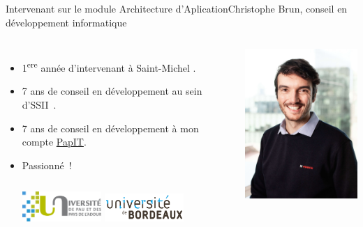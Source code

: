 \documentclass{beamer}
\begin{document}
    \begin{frame}{Intervenant sur le module Architecture d'Aplication}{Christophe Brun, conseil en développement informatique}

        \begin{columns}
            \begin{itemize}
                \item 1\textsuperscript{ere} année d'intervenant à Saint-Michel .

                \item 7 ans de conseil en développement au sein d'SSII~.

                \item 7 ans de conseil en développement à mon compte \href{https://papit.fr}{PapIT}.

                \item Passionné~!
                \bigbreak
                \begin{columns}
                    \centering
                    \includegraphics[width=3cm]{image/logo-uppa}
                    \centering
                    \includegraphics[width=3cm]{image/logo-universite-bordeaux}
                \end{columns}
            \end{itemize}
            \centering
            \includegraphics[width=5cm]{image/trombine-christophe}
        \end{columns}
    \end{frame}
\end{document}
